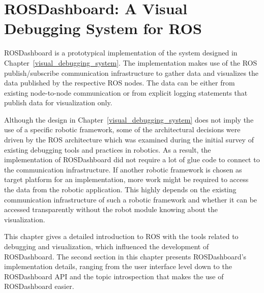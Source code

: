 \chapter{ROSDashboard: A Visual Debugging System for ROS}
\label{rosdashboard}

ROSDashboard is a prototypical implementation of the system designed in Chapter~\ref{visual_debugging_system}. The implementation makes use of the ROS publish/subscribe communication infrastructure to gather data and visualizes the data published by the respective ROS nodes. The data can be either from existing node-to-node communication or from explicit logging statements that publish data for visualization only.

Although the design in Chapter~\ref{visual_debugging_system} does not imply the use of a specific robotic framework, some of the architectural decisions were driven by the ROS architecture which was examined during the initial survey of existing debugging tools and practices in robotics. As a result, the implementation of ROSDashboard did not require a lot of glue code to connect to the communication infrastructure. If another robotic framework is chosen as target platform for an implementation, more work might be required to access the data from the robotic application. This highly depends on the existing communication infrastructure of such a robotic framework and whether it can be accessed transparently without the robot module knowing about the visualization.

This chapter gives a detailed introduction to ROS with the tools related to debugging and visualization, which influenced the development of ROSDashboard. The second section in this chapter presents ROSDashboard's implementation details, ranging from the user interface level down to the ROSDashboard API and the topic introspection that makes the use of ROSDashboard easier.



